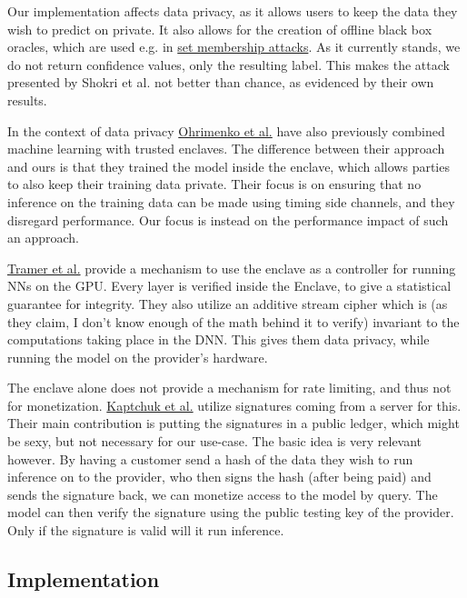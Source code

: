 \documentclass[11pt]{article}
\begin{document}
Our implementation affects data privacy, as it allows users to keep the data they wish to predict on private.
It also allows for the creation of offline black box oracles, which are used e.g. in \href{related\_work/shokri17membership.pdf}{set membership attacks}.
As it currently stands, we do not return confidence values, only the resulting label.
This makes the attack presented by Shokri et al. not better than chance, as evidenced by their own results.

In the context of data privacy \href{related\_work/ohrimenko16enclave.pdf}{Ohrimenko et al.} have also previously combined machine learning with trusted enclaves.
The difference between their approach and ours is that they trained the model inside the enclave, which allows parties to also keep their training data private.
Their focus is on ensuring that no inference on the training data can be made using timing side channels, and they disregard performance.
Our focus is instead on the performance impact of such an approach.

\href{related\_work/tramer19slalom.pdf}{Tramer et al.} provide a mechanism to use the enclave as a controller for running NNs on the GPU.
Every layer is verified inside the Enclave, to give a statistical guarantee for integrity.
They also utilize an additive stream cipher which is (as they claim, I don't know enough of the math behind it to verify) invariant to the computations taking place in the DNN.
This gives them data privacy, while running the model on the provider's hardware.

The enclave alone does not provide a mechanism for rate limiting, and thus not for monetization.
\href{related\_work/kaptchuk2019state.pdf}{Kaptchuk et al.} utilize signatures coming from a server for this.
Their main contribution is putting the signatures in a public ledger, which might be sexy, but not necessary for our use-case.
The basic idea is very relevant however.
By having a customer send a hash of the data they wish to run inference on to the provider, who then signs the hash (after being paid) and sends the signature back, we can monetize access to the model by query.
The model can then verify the signature using the public testing key of the provider.
Only if the signature is valid will it run inference.

\subsection{Implementation}
\label{sec:orgf8d657f}
\label{org2e69037}
\end{document}

